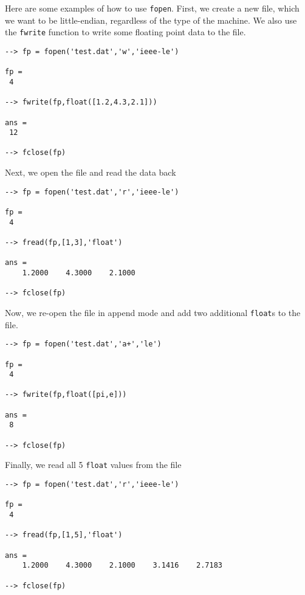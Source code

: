 Here are some examples of how to use \verb|fopen|.  First, we create a new 
file, which we want to be little-endian, regardless of the type of the machine.
We also use the \verb|fwrite| function to write some floating point data to
the file.
\begin{verbatim}
--> fp = fopen('test.dat','w','ieee-le')

fp = 
 4 

--> fwrite(fp,float([1.2,4.3,2.1]))

ans = 
 12 

--> fclose(fp)
\end{verbatim}
Next, we open the file and read the data back
\begin{verbatim}
--> fp = fopen('test.dat','r','ieee-le')

fp = 
 4 

--> fread(fp,[1,3],'float')

ans = 
    1.2000    4.3000    2.1000 

--> fclose(fp)
\end{verbatim}
Now, we re-open the file in append mode and add two additional \verb|float|s to the
file.
\begin{verbatim}
--> fp = fopen('test.dat','a+','le')

fp = 
 4 

--> fwrite(fp,float([pi,e]))

ans = 
 8 

--> fclose(fp)
\end{verbatim}
Finally, we read all 5 \verb|float| values from the file
\begin{verbatim}
--> fp = fopen('test.dat','r','ieee-le')

fp = 
 4 

--> fread(fp,[1,5],'float')

ans = 
    1.2000    4.3000    2.1000    3.1416    2.7183 

--> fclose(fp)
\end{verbatim}

